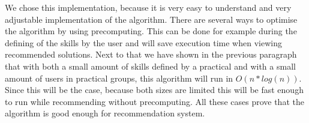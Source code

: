 We chose this implementation, because it is very easy to understand and very adjustable implementation of the algorithm.
There are several ways to optimise the algorithm by using precomputing.
This can be done for example during the defining of the skills by the user and will save execution time when viewing recommended solutions.
Next to that we have shown in the previous paragraph that with both a small amount of skills defined by a practical and with a small amount of users in practical groups, this algorithm will run in $O(n*log(n))$.
Since this will be the case, because both sizes are limited this will be fast enough to run while recommending without precomputing.
All these cases prove that the algorithm is good enough for recommendation system.



